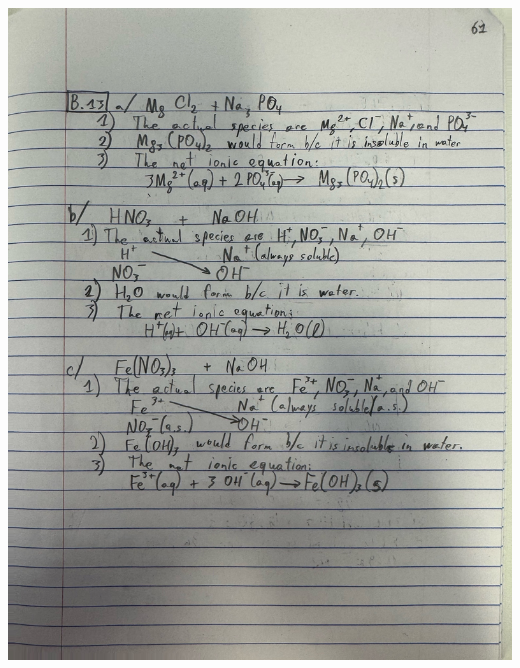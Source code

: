 \documentclass[10pt]{article}
\begin{document}
\begin{center}
                \includegraphics[width=\textwidth, trim={5in 13.5in 3in 29in},clip]{"Answers Images/IMG_6647.jpg"}


\end{center}
\end{document}
